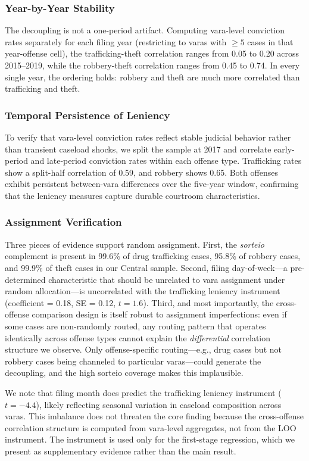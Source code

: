 \documentclass[12pt]{article}
\begin{document}
\subsubsection*{Year-by-Year Stability} The decoupling is not a one-period artifact. Computing vara-level conviction rates separately for each filing year (restricting to varas with $\geq 5$ cases in that year-offense cell), the trafficking-theft correlation ranges from 0.05 to 0.20 across 2015--2019, while the robbery-theft correlation ranges from 0.45 to 0.74. In every single year, the ordering holds: robbery and theft are much more correlated than trafficking and theft.

\subsubsection*{Temporal Persistence of Leniency} To verify that vara-level conviction rates reflect stable judicial behavior rather than transient caseload shocks, we split the sample at 2017 and correlate early-period and late-period conviction rates within each offense type. Trafficking rates show a split-half correlation of 0.59, and robbery shows 0.65. Both offenses exhibit persistent between-vara differences over the five-year window, confirming that the leniency measures capture durable courtroom characteristics.

\subsubsection*{Assignment Verification} Three pieces of evidence support random assignment. First, the \textit{sorteio} complement is present in 99.6\% of drug trafficking cases, 95.8\% of robbery cases, and 99.9\% of theft cases in our Central sample. Second, filing day-of-week---a pre-determined characteristic that should be unrelated to vara assignment under random allocation---is uncorrelated with the trafficking leniency instrument (coefficient = 0.18, SE = 0.12, $t = 1.6$). Third, and most importantly, the cross-offense comparison design is itself robust to assignment imperfections: even if some cases are non-randomly routed, any routing pattern that operates identically across offense types cannot explain the \textit{differential} correlation structure we observe. Only offense-specific routing---e.g., drug cases but not robbery cases being channeled to particular varas---could generate the decoupling, and the high sorteio coverage makes this implausible.

We note that filing month does predict the trafficking leniency instrument ($t = -4.4$), likely reflecting seasonal variation in caseload composition across varas. This imbalance does not threaten the core finding because the cross-offense correlation structure is computed from vara-level aggregates, not from the LOO instrument. The instrument is used only for the first-stage regression, which we present as supplementary evidence rather than the main result.
\end{document}
